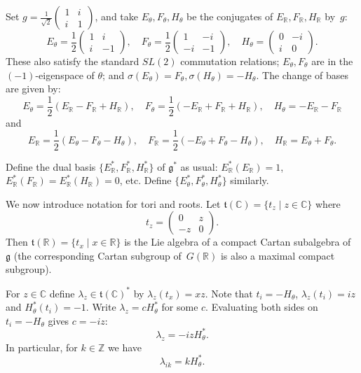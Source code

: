 \documentclass[cupthm]{CUP-JNL-JMJ}
\numberwithin{equation}{section}
\theoremstyle{cupplain}
\theoremstyle{cupdefinition}
\theoremstyle{cupremark}
\theoremstyle{cupproof}
\newcommand{\R}{\mathbb R}
\newcommand{\C}{\mathbb C}
\newcommand{\Z}{\mathbb Z}
\renewcommand{\t}{\mathfrak t}
\newcommand{\g}{\mathfrak g}
\begin{document}
Set $g=\frac 1{\sqrt 2}\begin{pmatrix}1&i\\i&1
\end{pmatrix}$, and take $E_\theta,F_\theta,H_\theta$ be the conjugates of $E_\R,F_\R,H_\R$ by~$g$:
$$
E_\theta=\frac12\begin{pmatrix}1&i\\i&-1\end{pmatrix}, \quad
F_\theta=\frac12\begin{pmatrix}1&-i\\-i&-1\end{pmatrix},\quad
H_\theta=\begin{pmatrix}0&-i\\i&0\end{pmatrix}.
$$
These also satisfy the standard $SL(2)$ commutation relations; $E_\theta,F_\theta$ are in the $(-1)$-eigenspace of $\theta$; 
and  $\sigma(E_\theta)=F_\theta,\sigma(H_\theta)=-H_\theta$. The change of bases are given by:
$$
  E_\theta=\frac12(E_\R-F_\R+H_\R), \quad 
  F_\theta=\frac12(-E_\R+F_\R+H_\R), \quad
  H_\theta=-E_\R-F_\R
$$
and
$$
   E_\R=\frac12(E_\theta-F_\theta-H_\theta), \quad 
  F_\R=\frac12(-E_\theta+F_\theta-H_\theta), \quad 
  H_\R=E_\theta+F_\theta.
$$

Define the dual basis
 $\{E_\R^*,F_\R^*,H_\R^*\}$ of $\g^*$ as usual: $E_\R^*(E_\R)=1$, $E_\R^*(F_\R)=E_\R^*(H_\R)=0$, etc. Define 
 $\{E_\theta^*,F_\theta^*,H_\theta^*\}$ similarly.
 
\medskip


We now introduce notation for tori and roots. Let $\t(\C)=\{t_z\mid z\in\C\}$ where
$$
t_z=\begin{pmatrix}0&z\\-z&0
\end{pmatrix}.
$$
Then $\t(\R)=\{t_x\mid x\in\R\}$ is the Lie algebra of a compact Cartan subalgebra of $\g$ (the corresponding Cartan subgroup of~$G(\R)$ is also a maximal compact subgroup).




For $z\in \C$ define $\lambda_z\in \t(\C)^*$ by $\lambda_z(t_x)=xz$.
Note that $t_i=-H_\theta$, $\lambda_z(t_i)=iz$ and $H_\theta^*(t_i)=-1$.
Write $\lambda_z=cH_\theta^*$ for some $c$. Evaluating both sides on $t_i=-H_\theta$ gives
$c=-iz$:
\begin{equation}
\label{e:lambdaz}
\lambda_z=-izH_\theta^*.
\end{equation}
In particular, for $k \in \Z$ we have
\begin{equation}
\label{e:lambdai}
\lambda_{ik}=kH_\theta^*.
\end{equation}
\end{document}
